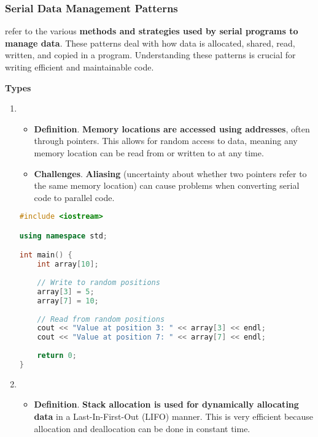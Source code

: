 \subsubsection{Serial Data Management Patterns}

 refer to the various \textbf{methods and strategies used by serial programs to manage data}. These patterns deal with how data is allocated, shared, read, written, and copied in a program. Understanding these patterns is crucial for writing efficient and maintainable code.

\highspace
\begin{flushleft}
    \textcolor{Green3}{ \textbf{Types}}
\end{flushleft}
\begin{enumerate}
    \item {}
    \begin{itemize}
        \item[\textcolor{Red2}{\faIcon{book}}] \textcolor{Red2}{\textbf{Definition}}. \textbf{Memory locations are accessed using addresses}, often through pointers. This allows for random access to data, meaning any memory location can be read from or written to at any time.

        \item[\textcolor{Green3}{\faIcon{question}}] \textcolor{Green3}{\textbf{Challenges}}. \textbf{Aliasing} (uncertainty about whether two pointers refer to the same memory location) can cause problems when converting serial code to parallel code.
    \end{itemize}
    \begin{examplebox}
        \begin{lstlisting}[language=c++]
#include <iostream>

using namespace std;

int main() {
    int array[10];
    
    // Write to random positions
    array[3] = 5;
    array[7] = 10;
    
    // Read from random positions
    cout << "Value at position 3: " << array[3] << endl;
    cout << "Value at position 7: " << array[7] << endl;
    
    return 0;
}\end{lstlisting}
    \end{examplebox}


    \newpage
    \item {}
    \begin{itemize}
        \item[\textcolor{Red2}{\faIcon{book}}] \textcolor{Red2}{\textbf{Definition}}. \textbf{Stack allocation is used for dynamically allocating data} in a Last-In-First-Out (LIFO) manner. This is very efficient because allocation and deallocation can be done in constant time.


\end{itemize}
\end{enumerate}
